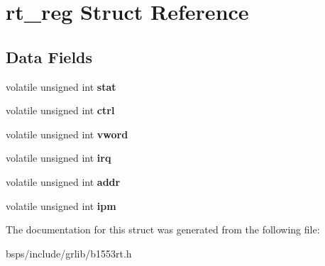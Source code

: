 \hypertarget{structrt__reg}{}\section{rt\+\_\+reg Struct Reference}
\label{structrt__reg}
\subsection*{Data Fields}
\begin{DoxyCompactItemize}
\item 
\mbox{\label{structrt__reg_aa739fef19d7bfd9dcae85ac0e0de04d5}} 
volatile unsigned int {\bfseries stat}
\item 
\mbox{\label{structrt__reg_ad92b514c1a6755cb96e1af72ff1946aa}} 
volatile unsigned int {\bfseries ctrl}
\item 
\mbox{\label{structrt__reg_ac2e882825550ccb2485a53f5084c233a}} 
volatile unsigned int {\bfseries vword}
\item 
\mbox{\label{structrt__reg_a66484e210fa69fcc935cf9d76c9e1470}} 
volatile unsigned int {\bfseries irq}
\item 
\mbox{\label{structrt__reg_a6a8a7643c6c3bc63c61f28367bd3dbb2}} 
volatile unsigned int {\bfseries addr}
\item 
\mbox{\label{structrt__reg_acc5627c0a63a87324976fb5f54575f29}} 
volatile unsigned int {\bfseries ipm}
\end{DoxyCompactItemize}


The documentation for this struct was generated from the following file\+:\begin{DoxyCompactItemize}
\item 
bsps/include/grlib/b1553rt.\+h\end{DoxyCompactItemize}
